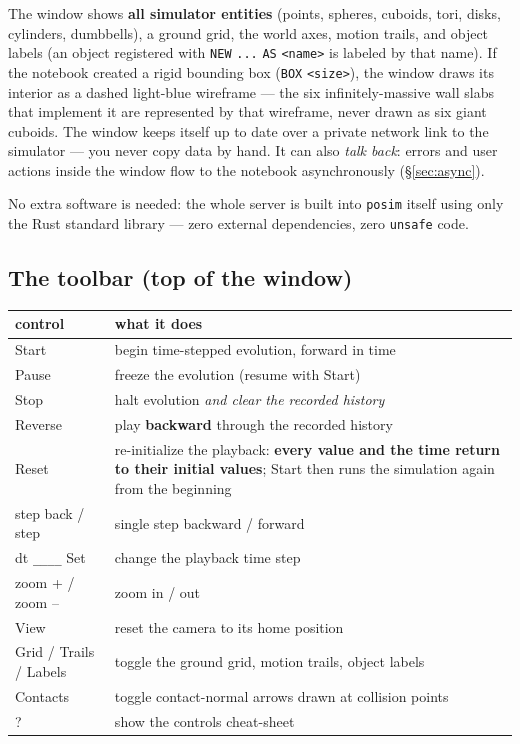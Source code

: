 \documentclass[11pt]{article}
\newcommand{\kw}[1]{\texttt{\uppercase{#1}}}
\newcommand{\code}[1]{\texttt{#1}}
\begin{document}
The window shows \textbf{all simulator entities} (points, spheres,
cuboids, tori, disks, cylinders, dumbbells), a ground grid, the world
axes, motion trails, and object labels (an object registered with
\kw{new} \code{...} \kw{as} \code{<name>} is labeled by that name).
If the notebook created a rigid
bounding box (\kw{box} \code{<size>}), the window draws its interior
as a dashed light-blue wireframe --- the six infinitely-massive wall
slabs that implement it are represented by that wireframe, never
drawn as six giant cuboids. The window keeps itself up to date over a
private network link to the simulator --- you never copy data by
hand. It can also \emph{talk back}: errors and user actions inside
the window flow to the notebook asynchronously (\S\ref{sec:async}).

No extra software is needed: the whole server is built into
\code{posim} itself using only the Rust standard library --- zero
external dependencies, zero \code{unsafe} code.

\subsection{The toolbar (top of the window)}

\begin{center}
\begin{tabular}{lp{9.2cm}}
\textbf{control} & \textbf{what it does}\\\hline
Start & begin time-stepped evolution, forward in time\\
Pause & freeze the evolution (resume with Start)\\
Stop & halt evolution \emph{and clear the recorded history}\\
Reverse & play \textbf{backward} through the recorded history\\
Reset & re-initialize the playback: \textbf{every value and the time return to their initial values}; Start then runs the simulation again from the beginning\\
step back / step & single step backward / forward\\
dt \code{\_\_\_\_} Set & change the playback time step\\
zoom + / zoom -- & zoom in / out\\
View & reset the camera to its home position\\
Grid / Trails / Labels & toggle the ground grid, motion trails, object labels\\
Contacts & toggle contact-normal arrows drawn at collision points\\
? & show the controls cheat-sheet\\
\end{tabular}
\end{center}
\end{document}
